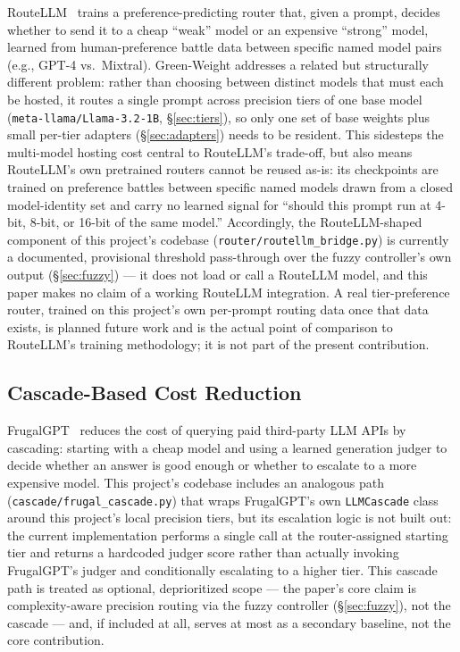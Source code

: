 \documentclass[conference]{IEEEtran}
\begin{document}
RouteLLM~\cite{routellm} trains a preference-predicting router that,
given a prompt, decides whether to send it to a cheap ``weak'' model or an
expensive ``strong'' model, learned from human-preference battle data
between specific named model pairs (e.g., GPT-4 vs.\ Mixtral).
Green-Weight addresses a related but structurally different problem:
rather than choosing between distinct models that must each be hosted, it
routes a single prompt across precision tiers of one base model
(\texttt{meta-llama/Llama-3.2-1B}, \S\ref{sec:tiers}), so only one set of
base weights plus small per-tier adapters (\S\ref{sec:adapters}) needs to
be resident. This sidesteps the multi-model hosting cost central to
RouteLLM's trade-off, but also means RouteLLM's own pretrained routers
cannot be reused as-is: its checkpoints are trained on preference battles
between specific named models drawn from a closed model-identity set and
carry no learned signal for ``should this prompt run at 4-bit, 8-bit, or
16-bit of the same model.'' Accordingly, the RouteLLM-shaped component of
this project's codebase (\texttt{router/routellm\_bridge.py}) is currently
a documented, provisional threshold pass-through over the fuzzy
controller's own output (\S\ref{sec:fuzzy}) --- it does not load or call a
RouteLLM model, and this paper makes no claim of a working RouteLLM
integration. A real tier-preference router, trained on this project's own
per-prompt routing data once that data exists, is planned future work and
is the actual point of comparison to RouteLLM's training methodology; it
is not part of the present contribution.

\subsection{Cascade-Based Cost Reduction}

FrugalGPT~\cite{frugalgpt} reduces the cost of querying paid third-party
LLM APIs by cascading: starting with a cheap model and using a learned
generation judger to decide whether an answer is good enough or whether
to escalate to a more expensive model. This project's codebase includes
an analogous path (\texttt{cascade/frugal\_cascade.py}) that wraps
FrugalGPT's own \texttt{LLMCascade} class around this project's local
precision tiers, but its escalation logic is not built out: the current
implementation performs a single call at the router-assigned starting
tier and returns a hardcoded judger score rather than actually invoking
FrugalGPT's judger and conditionally escalating to a higher tier. This
cascade path is treated as optional, deprioritized scope --- the paper's
core claim is complexity-aware precision routing via the fuzzy controller
(\S\ref{sec:fuzzy}), not the cascade --- and, if included at all, serves
at most as a secondary baseline, not the core contribution.
\end{document}
